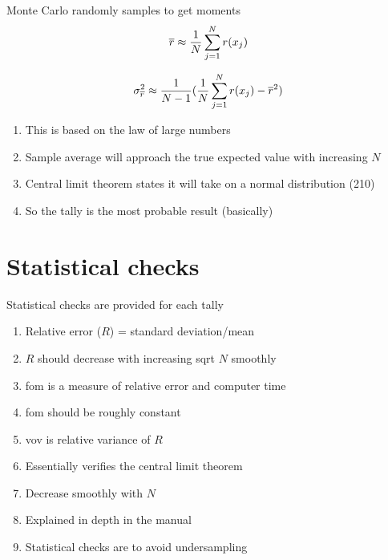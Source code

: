 \documentclass[aspectratio=1610,pdftex,dvipsnames,compress,xcolor={dvipsnames}]{beamer}
\newcommand{\acf}{\acrfull} %
\newcommand{\acs}{\acrshort} %
\begin{document}
\begin{frame}{Monte Carlo randomly samples to get moments}
    \begin{equation}
        \LARGE
        \overline{r} \approx \frac{1}{N}\sum_{j=1}^N r(x_j)
    \end{equation}

    \begin{equation}
        \LARGE
        \sigma^2_{\overline{r}} \approx \frac{1}{N-1}(\frac{1}{N}\sum_{j=1}^N r(x_j) - \overline{r}^2)
    \end{equation}

    \vspace*{\fill}

    \begin{enumerate}[series=outerlist,topsep=0pt,itemsep=18pt,leftmargin=*,label=(\arabic*)]
        \item[]This is based on the law of large numbers  
        \item[]Sample average will approach the true expected value with increasing $N$ 
        \item[]Central limit theorem states it will take on a normal distribution (210)
        \item[]So the tally is the most probable result (basically)
    \end{enumerate}
\end{frame}


\section{Statistical checks}


\addtocounter{framenumber}{-1} 
\begin{frame}{Statistical checks are provided for each tally}
    \begin{enumerate}[series=outerlist,topsep=0pt,itemsep=5pt,leftmargin=*,label=(\arabic*)]
        \item[]Relative error ($R$) = standard deviation/mean
        \item[]$R$ should decrease with increasing sqrt $N$ smoothly
            \vspace{0.15in}
        \item[]\acs{fom} is a measure of relative error and computer time
        \item[]\acs{fom} should be roughly constant
            \vspace{0.15in}
        \item[]\acf{vov} is relative variance of $R$
        \item[]Essentially verifies the central limit theorem
        \item[]Decrease smoothly with $N$
        \item[]Explained in depth in the manual
            \vspace{0.15in}
        \item[]Statistical checks are to avoid undersampling
    \end{enumerate}
\end{frame}
\end{document}
